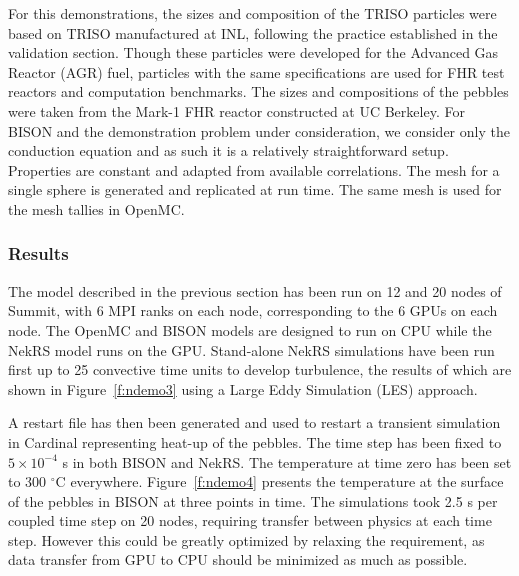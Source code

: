For this demonstrations, the sizes and composition of the TRISO particles were based on TRISO manufactured at INL, following the practice established in the validation section. Though these particles were developed for the Advanced Gas Reactor (AGR) fuel, particles with the same specifications are used for FHR test reactors and computation benchmarks. The sizes and compositions of the pebbles were taken from the Mark-1 FHR reactor constructed at UC Berkeley. For BISON and the demonstration problem under consideration, we consider only the conduction equation and as such it is a relatively straightforward setup. Properties are constant and adapted from available correlations. The mesh for a single sphere is generated and replicated at run time. The same mesh is used for the mesh tallies in OpenMC.

\subsubsection{Results}

The model described in the previous section has been run on 12 and 20 nodes of Summit, with 6 MPI ranks on each node, corresponding to the 6 GPUs on each node. The OpenMC and BISON models are designed to run on CPU while the NekRS model runs on the GPU. Stand-alone NekRS simulations have been run first up to 25 convective time units to develop turbulence, the results of which are shown in Figure~\ref{f:ndemo3} using a Large Eddy Simulation (LES) approach.

A restart file has then been generated and used to restart a transient simulation in Cardinal representing heat-up of the pebbles. The time step has been fixed to $5\times 10^{-4}$ s in both BISON and NekRS. The temperature at time zero has been set to 300 $^{\circ}$C everywhere. Figure~\ref{f:ndemo4} presents the temperature at the surface of the pebbles in BISON at three points in time. The simulations took 2.5 s per coupled time step on 20 nodes, requiring transfer between physics at each time step. However this could be greatly optimized by relaxing the requirement, as data transfer from GPU to CPU should be minimized as much as possible.

